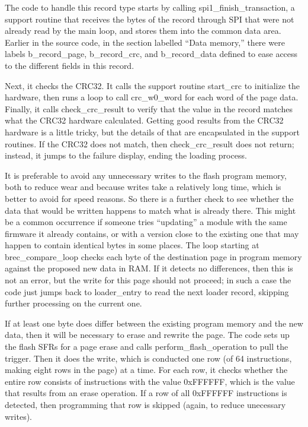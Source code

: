 The code to handle this record type starts by calling
spi1\_finish\_transaction, a support routine that receives the bytes of the
record through SPI that were not already read by the main loop, and stores
them into the common data area.  Earlier in the source code, in the section
labelled ``Data memory,'' there were labels b\_record\_page, b\_record\_crc,
and b\_record\_data defined to ease access to the different fields in this
record.

Next, it checks the CRC32.  It calls the support routine start\_crc to
initialize the hardware, then runs a loop to call crc\_w0\_word for each
word of the page data.  Finally, it calls check\_crc\_result to verify that
the value in the record matches what the CRC32 hardware calculated.  Getting
good results from the CRC32 hardware is a little tricky, but the details of
that are encapsulated in the support routines.  If the CRC32 does not match,
then check\_crc\_result does not return; instead, it jumps to the failure
display, ending the loading process.

It is preferable to avoid any unnecessary writes to the flash program
memory, both to reduce wear and because writes take a relatively long time,
which is better to avoid for speed reasons.  So there is a further check to
see whether the data that would be written happens to match what is already
there.  This might be a common occurrence if someone tries ``updating'' a
module with the same firmware it already contains, or with a version close
to the existing one that may happen to contain identical bytes in some
places.  The loop starting at brec\_compare\_loop checks each byte of the
destination page in program memory against the proposed new data in RAM.  If
it detects no differences, then this is not an error, but the write for this
page should not proceed; in such a case the code just jumps back to
loader\_entry to read the next loader record, skipping further processing on
the current one.

If at least one byte does differ between the existing program memory and the
new data, then it will be necessary to erase and rewrite the page.  The code
sets up the flash SFRs for a page erase and calls perform\_flash\_operation
to pull the trigger.  Then it does the write, which is conducted one row (of
64 instructions, making eight rows in the page) at a time.  For each row, it
checks whether the entire row consists of instructions with the value
0xFFFFFF, which is the value that results from an erase operation.  If a row
of all 0xFFFFFF instructions is detected, then programming that row is
skipped (again, to reduce unecessary writes).

